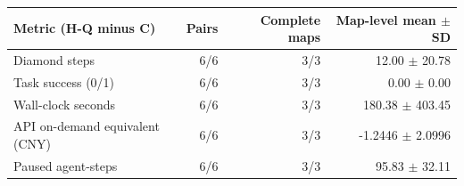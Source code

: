 \begin{tabular}{lrrr}
\hline
Metric (H-Q minus C) & Pairs & Complete maps & Map-level mean \(\pm\) SD \\
\hline
Diamond steps & 6/6 & 3/3 & 12.00 \(\pm\) 20.78 \\
Task success (0/1) & 6/6 & 3/3 & 0.00 \(\pm\) 0.00 \\
Wall-clock seconds & 6/6 & 3/3 & 180.38 \(\pm\) 403.45 \\
API on-demand equivalent (CNY) & 6/6 & 3/3 & -1.2446 \(\pm\) 2.0996 \\
Paused agent-steps & 6/6 & 3/3 & 95.83 \(\pm\) 32.11 \\
\hline
\end{tabular}
